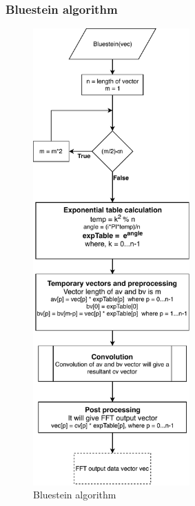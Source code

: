 \begin{refsection}
\subsubsection{Bluestein algorithm}
\begin{figure}[h]
	\centering
	\includegraphics[width=6cm]{./algorithms/fft/figures/Bluestein.pdf}
	\caption{Bluestein algorithm}\label{Bluestein}
\end{figure}

\newpage

\end{refsection}
